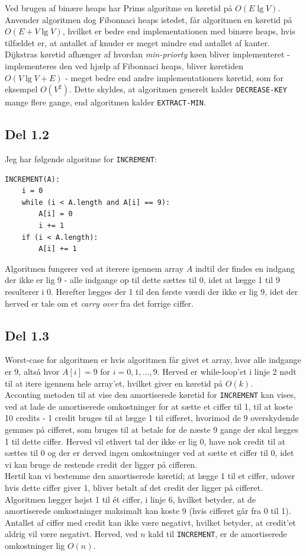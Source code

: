\documentclass{report}
\begin{document}
Ved brugen af binære heaps har Prims algoritme en køretid på $O(E \lg V)$. Anvender algoritmen dog Fibonnaci heaps istedet, får algoritmen en køretid på $O(E + V \lg V)$, hvilket er bedre end implementationen med binære heaps, hvis tilfældet er, at antallet af knuder er meget mindre end antallet af kanter. \\
Dijkstras køretid afhænger af hvordan \textit{min-priorty} køen bliver implementeret - implementeres den ved hjælp af Fibonnaci heaps, bliver køretiden $O(V \lg V + E)$ - meget bedre end andre implementationers køretid, som for eksempel $O(V^2)$. Dette skyldes, at algoritmen generelt kalder \texttt{DECREASE-KEY} mange flere gange, end algoritmen kalder \texttt{EXTRACT-MIN}.

\newpage

\subsection*{Del 1.2}
Jeg har følgende algoritme for \texttt{INCREMENT}:
\begin{verbatim}
INCREMENT(A):
    i = 0
    while (i < A.length and A[i] == 9):
        A[i] = 0
        i += 1
    if (i < A.length):
        A[i] += 1
\end{verbatim}
Algoritmen fungerer ved at iterere igennem array $A$ indtil der findes en indgang der ikke er lig 9 - alle indgange op til dette sættes til 0, idet at lægge 1 til 9 resulterer i 0. Herefter lægges der 1 til den første værdi der ikke er lig 9, idet der herved er tale om et \textit{carry over} fra det forrige ciffer.

\newpage

\subsection*{Del 1.3}
Worst-case for algoritmen er hvis algoritmen får givet et array, hvor alle indgange er 9, altså hvor $A[i] = 9$ for $i = 0, 1, ..., 9$. Herved er while-loop'et i linje 2 nødt til at itere igennem hele array'et, hvilket giver en køretid på $O(k)$. \\
Acconting metoden til at vise den amortiserede køretid for \texttt{INCREMENT} kan vises, ved at lade de amortiserede omkostninger for at sætte et ciffer til 1, til at koste 10 credits - 1 credit bruges til at lægge 1 til cifferet, hvorimod de 9 overskydende gemmes på cifferet, som bruges til at betale for de næste 9 gange der skal lægges 1 til dette ciffer. Herved vil ethvert tal der ikke er lig 0, have nok credit til at sættes til 0 og der er derved ingen omkostninger ved at sætte et ciffer til 0, idet vi kan bruge de restende credit der ligger på cifferen. \\
Hertil kan vi bestemme den amortiserede køretid; at lægge 1 til et ciffer, udover hvis dette ciffer giver 1, bliver betalt af det credit der ligger på cifferet. Algoritmen lægger højst 1 til ét ciffer, i linje 6, hvilket betyder, at de amortiserede omkostninger maksimalt kan koste 9 (hvis cifferet går fra 0 til 1). Antallet af ciffer med credit kan ikke være negativt, hvilket betyder, at credit'et aldrig vil være negativt. Herved, ved $n$ kald til \texttt{INCREMENT}, er de amortiserede omkostninger lig $O(n)$.
\end{document}
